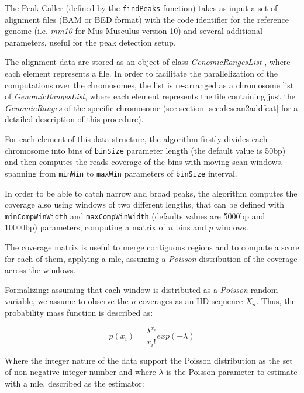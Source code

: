 The Peak Caller (defined by the \lstinline!findPeaks! function) takes as input a set of alignment files (BAM \cite{Li2009} or BED format) with the code identifier for the reference genome (i.e. \textit{mm10} for Mus Musculus version 10) and several additional parameters, useful for the peak detection setup.

The alignment data are stored as an object of class \textit{GenomicRangesList} \cite{Lawrence2013}, where each element represents a file. 
In order to facilitate the parallelization of the computations over the chromosomes, the list is re-arranged as a chromosome list of \textit{GenomicRangesList}, where each element represents the file containing just the \textit{GenomicRanges} of the specific chromosome (see section \ref{sec:descan2addfeat} for a detailed description of this procedure).

For each element of this data structure, the algorithm firstly divides each chromosome into bins of \lstinline!binSize! parameter length (the default value is 50bp) and then computes the reads coverage of the bins with moving scan windows, spanning from \lstinline!minWin! to \lstinline!maxWin! parameters of \lstinline!binSize! interval.

In order to be able to catch narrow and broad peaks, the algorithm computes the coverage also using windows of two different lengths, that can be defined with \lstinline!minCompWinWidth! and \lstinline!maxCompWinWidth! (defaults values are 5000bp and 10000bp) parameters, computing a matrix of $n$ bins and $p$ windows.

The coverage matrix is useful to merge contiguous regions and to compute a score for each of them, applying a \gls{mle}, assuming a \textit{Poisson} distribution of the coverage across the windows.

Formalizing: assuming that each window is distributed as a \textit{Poisson} random variable, we assume to observe the $n$ coverages as an IID sequence $X_n$. Thus, the probability mass function is described as:

\[ p(x_i) = \frac{\lambda^{x_i}}{{x_i!}} exp(-\lambda) \]

Where the integer nature of the data support the Poisson distribution as the set of non-negative integer number and where $\lambda$ is the Poisson parameter to estimate with a \gls{mle}, described as the estimator:

